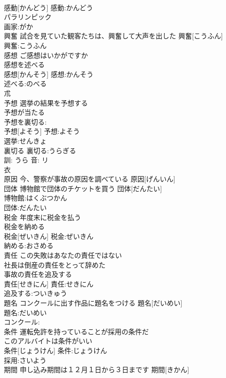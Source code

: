 \documentclass[8pt]{extreport}
\begin{document}
\begin{CJK}{UTF8}{min}
\\	感動[かんどう]			感動:かんどう
\\	パラリンピック
\\	画家:がか
\\	興奮	試合を見ていた観客たちは、興奮して大声を出した	興奮[こうふん]	
\\	興奮:こうふん
\\	感想	ご感想はいかがですか 
\\	感想を述べる 
\\	感想[かんそう]			感想:かんそう
\\	述べる:のべる
\\	朮 
\\	予想	選挙の結果を予想する 
\\	予想が当たる 
\\	予想を裏切る: 
\\	予想[よそう]			予想:よそう
\\	選挙:せんきょ
\\	裏切る 裏切る:うらぎる
\\	訓: うら 音: リ 
\\	衣 
\\	原因	今、警察が事故の原因を調べている	原因[げんいん]	
\\	団体	博物館で団体のチケットを買う	団体[だんたい]	
\\	博物館:はくぶつかん
\\	団体:だんたい
\\	税金	年度末に税金を払う 
\\	税金を納める 
\\	税金[ぜいきん]			税金:ぜいきん
\\	納める:おさめる
\\	責任	この失敗はあなたの責任ではない 
\\	社長は倒産の責任をとって辞めた 
\\	事故の責任を追及する 
\\	責任[せきにん]			責任:せきにん
\\	追及する:ついきゅう
\\	題名	コンクールに出す作品に題名をつける	題名[だいめい]	
\\	題名:だいめい
\\	コンクール:
\\	条件	運転免許を持っていることが採用の条件だ 
\\	このアルバイトは条件がいい 
\\	条件[じょうけん]			条件:じょうけん
\\	採用:さいよう
\\	期間	申し込み期間は１２月１日から３日まです	期間[きかん]	

\end{CJK}
\end{document}
